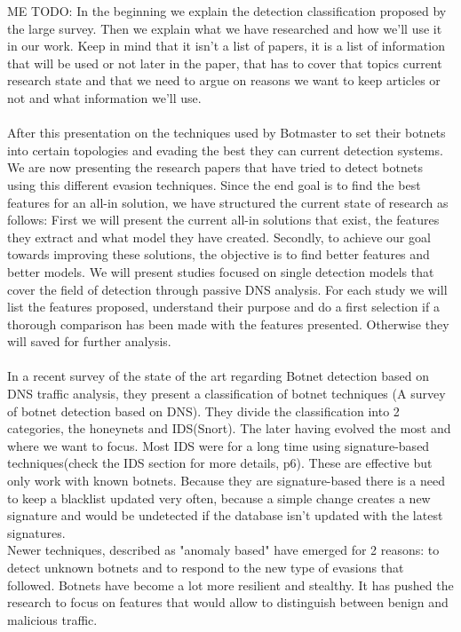 ME
TODO: In the beginning we explain the detection classification proposed by the large survey. Then we explain what we have researched and how we'll use it in our work. Keep in mind that it isn't a list of papers, it is a list of information that will be used or not later in the paper, that has to cover that topics current research state and that we need to argue on reasons we want to keep articles or not and what information we'll use.
\\\\
After this presentation on the techniques used by Botmaster to set their botnets into certain topologies and evading the best they can current detection systems. We are now presenting the research papers that have tried to detect botnets using this different evasion techniques. Since the end goal is to find the best features for an all-in solution, we have structured the current state of research as follows: 
First we will present the current all-in solutions that exist, the features they extract and what model they have created. 
Secondly, to achieve our goal towards improving these solutions, the objective is to find better features and better models. We will present studies focused on single detection models that cover the field of detection through passive DNS analysis. For each study we will list the features proposed, understand their purpose and do a first selection if a thorough comparison has been made with the features presented. Otherwise they will saved for further analysis.
\\\\
In a recent survey of the state of the art regarding Botnet detection based on DNS traffic analysis\cite{survey}, they present a classification of botnet techniques (A survey of botnet detection based on DNS). They divide the classification into 2 categories, the honeynets and IDS(Snort). The later having evolved the most and where we want to focus. Most IDS were for a long time using signature-based techniques(check the IDS section for more details, p6). These are effective but only work with known botnets. Because they are signature-based there is a need to keep a blacklist updated very often, because a simple change creates a new signature and would be undetected if the database isn't updated with the latest signatures.\\
Newer techniques, described as "anomaly based" have emerged for 2 reasons: to detect unknown botnets and to respond to the new type of evasions that followed. Botnets have become a lot more resilient and stealthy. It has pushed the research to focus on features that would allow to distinguish between benign and malicious traffic.
